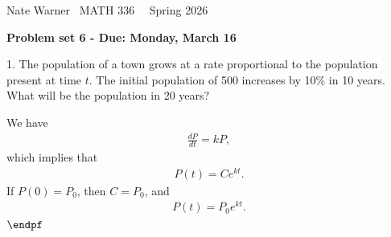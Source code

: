 \documentclass{report}
\title{\Huge{}}
\author{\huge{Nathan Warner}}
\date{\huge{}}
\begin{document}
    \pagebreak \bigbreak \noindent
    Nate Warner \ \quad \quad \quad \quad \quad \quad \quad \quad \quad \quad \quad \quad  MATH 336 \quad  \quad \quad \quad \quad \quad \quad \quad \quad \ \ \quad \quad Spring 2026
    \begin{center}
        \textbf{Problem set 6 - Due: Monday, March 16}
    \end{center}
    \bigbreak \noindent 
    \begin{mdframed}
        1. The population of a town grows at a rate proportional to the population present at time $t$. The initial population of 500 increases by 10\% in 10 years. What will be the population in 20 years?
    \end{mdframed}
    \bigbreak \noindent 
    \begin{remark}
       We have 
       \begin{align*}
           \frac{dP}{dt} = kP 
       ,\end{align*}
       which implies that
       \begin{align*}
           P(t) = Ce^{kt}
       .\end{align*}
       If $P(0) = P_{0}$, then $C = P_{0}$, and
       \begin{align*}
           P(t) = P_{0}e^{kt}
       .\end{align*}
       $\endpf$
    \end{remark}
\end{document}
